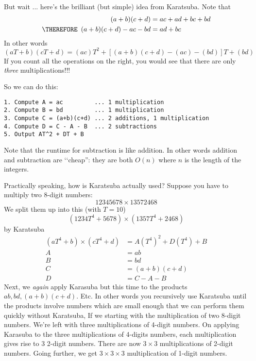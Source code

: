 But wait ... here's the brilliant (but simple) idea from Karatsuba.
Note that 
\begin{align*}
            (a+b)(c+d) &= ac + ad + bc + bd \\
\THEREFORE\,\,\,  (a+b)(c+d) - ac - bd &= ad + bc
\end{align*}
In other words
\[
(aT + b)(cT + d) = (ac)T^2 + [(a+b)(c+d) - (ac) - (bd)]T + (bd)
\]
If you count all the operations on the right,
you would see that there are only
\textit{ three} multiplications!!!

So we can do this:
\begin{Verbatim}[frame=single]
1. Compute A = ac         ... 1 multiplication
2. Compute B = bd         ... 1 multiplication
3. Compute C = (a+b)(c+d) ... 2 additions, 1 multiplication
4. Compute D = C - A - B  ... 2 subtractions
5. Output AT^2 + DT + B
\end{Verbatim}

Note that the runtime for subtraction is like addition.
In other words addition and subtraction are \lq\lq cheap'':
they are both $O(n)$ where $n$ is the length of the integers.

Practically speaking, how is Karatsuba actually used? 
Suppose you have to multiply two 8-digit numbers:
\[
12345678 \times 13572468
\]
We split them up into this (with $T = 10$)
\[
(1234T^4 + 5678) \times (1357T^4 + 2468)
\]
by Karatsuba
\begin{align*}
(a T^4 + b) \times (c T^4 + d) &= A (T^4)^2 + D (T^4) + B \\
A &= a b \\
B &= b d \\
C &= (a + b)(c + d) \\
D &= C - A - B
\end{align*}
Next, we
\textit{ again} apply Karasuba but this time to the products
$a b, b d, (a + b)(c + d)$.
Etc. 
In other words you recursively use Karatsuba
until the products involve numbers which are small enough
that we can perform them quickly without Karatsuba,
If we starting with the multiplication of two 8-digit numbers.
We're left with three multiplications of 4-digit numbers.
On applying Karasuba to the three multiplications of 4-digits numbers,
each multiplication gives rise to 3 2-digit numbers.
There are now $3 \times 3$ multiplications of 2-digit
numbers.
Going further, we get $3 \times 3 \times 3$ multiplication of 1-digit
numbers.

